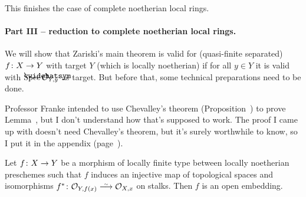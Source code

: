 \documentclass[a4paper,parskip=half,numbers=enddot, DIV=12]{scrreprt}
\begin{document}
This finishes the case of complete noetherian local rings.

\paragraph{Part III -- reduction to complete noetherian local rings.} We will show that Zariski's main theorem is valid for (quasi-finite separated) $f\colon X\morphism Y$ with target $Y$ (which is locally noetherian) if for all $y\in Y$ it is valid with $\Spec \roof{\Oo}_{Y,y}$ as target. But before that, some technical preparations need to be done.

Professor Franke intended to use Chevalley's theorem (Proposition~) to prove Lemma~, but I don't understand how that's supposed to work. The proof I came up with doesn't need Chevalley's theorem, but it's surely worthwhile to know, so I put it in the appendix (page~\pageref{prop:GenericFreeness}).
\begin{lem}
	Let $f\colon X\morphism Y$ be a morphism of locally finite type between locally noetherian preschemes such that $f$ induces an injective map of topological spaces and isomorphisms $f^*\colon \Oo_{Y,f(x)}\isomorphism \Oo_{X,x}$ on stalks. Then $f$ is an open embedding.
\end{lem}
\end{document}
